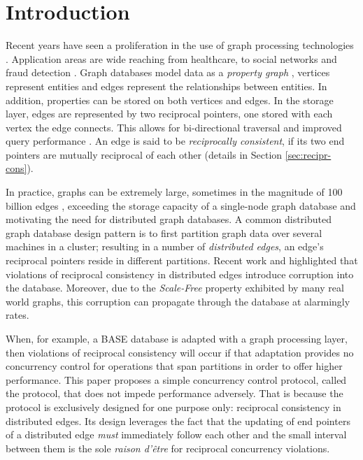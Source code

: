 \section{Introduction}
\label{sec:introduction}

Recent years have seen a proliferation in the use of graph processing technologies \cite{Besta2019}.
Application areas are wide reaching from healthcare, to social networks and fraud detection \cite{Eifrem2016}. Graph databases model data as a \textit{property graph} \cite{Robinson2015}, vertices represent entities and edges represent the relationships between entities.
In addition, properties can be stored on both vertices and edges.
In the storage layer, edges are represented by two reciprocal pointers, one stored with each vertex the edge connects.
This allows for bi-directional traversal and improved query performance \cite{Robinson2015}.
An edge is said to be \emph{reciprocally consistent}, if its two end pointers are mutually reciprocal of each other (details in Section \ref{sec:recipr-cons}).

In practice, graphs can be extremely large, sometimes in the magnitude of 100 billion edges \cite{Sahu2017}, exceeding the storage capacity of a single-node graph database and motivating the need for distributed graph databases.
A common distributed graph database design pattern is to first partition graph data over several machines in a cluster; resulting in a number of \emph{distributed edges}, an edge's reciprocal pointers reside in different partitions.
Recent work \cite{Ezhilchelvan2018} and \cite{Ezhilchelvan2019} highlighted that violations of reciprocal consistency in distributed edges introduce corruption into the database.
Moreover, due to the \emph{Scale-Free} \cite{ScaleFree} property exhibited by many real world graphs, this corruption can propagate through the database at alarmingly rates.

When, for example, a BASE database \cite{Pritchett2008} is adapted with a graph processing layer, then violations of reciprocal consistency will occur if that adaptation provides no concurrency control for operations that span partitions in order to offer higher performance.
This paper proposes a simple concurrency control protocol, called the \tDelta protocol, that does not impede performance adversely.
That is because the protocol is exclusively designed for one purpose only: reciprocal consistency in distributed edges.
Its design leverages the fact that the updating of end pointers of a distributed edge \emph{must} immediately follow each other and the small interval between them is the sole \emph{raison d'\^etre} for reciprocal concurrency violations.

